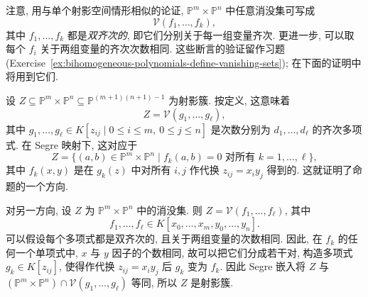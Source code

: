 注意, 用与单个射影空间情形相似的论证, $\mathbb{P}^{m}\times\mathbb{P}^{n}$ 中任意消没集可写成
\[
  \mathcal{V}(f_{1},\ldots,f_{k}),
\]
其中 $f_{1},\ldots,f_{k}$ 都是\emph{双齐次的}, 即它们分别关于每一组变量齐次. 更进一步, 可以取每个 $f_{i}$ 关于两组变量的齐次次数相同. 这些断言的验证留作习题 (Exercise~\ref{ex:bihomogeneous-polynomials-define-vanishing-sets}); 在下面的证明中将用到它们.

\begingroup
\renewcommand{\AJProofBegin}{%
  \par\addvspace{\topsep}\noindent
  {\sffamily\bfseries\CJKfamily{pffont}Proof of Proposition~\ref{prop:projective-subvarieties-of-product-are-vanishing-sets}}\enspace\ignorespaces
}
\begin{Proof}
设 $Z\subseteq\mathbb{P}^{m}\times\mathbb{P}^{n}\subseteq\mathbb{P}^{(m+1)(n+1)-1}$ 为射影簇. 按定义, 这意味着
\[
  Z=\mathcal{V}(g_{1},\ldots,g_{\ell}),
\]
其中 $g_{1},\ldots,g_{\ell}\in K[z_{ij}\mid0\le i\le m,\ 0\le j\le n]$ 是次数分别为 $d_{1},\ldots,d_{\ell}$ 的齐次多项式. 在 Segre 映射下, 这对应于
\[
  Z=\{(a,b)\in\mathbb{P}^{m}\times\mathbb{P}^{n}
      \mid f_{k}(a,b)=0\text{ 对所有 }k=1,\ldots,\ell\},
\]
其中 $f_{k}(x,y)$ 是在 $g_{k}(z)$ 中对所有 $i,j$ 作代换 $z_{ij}=x_{i}y_{j}$ 得到的. 这就证明了命题的一个方向.

对另一方向, 设 $Z$ 为 $\mathbb{P}^{m}\times\mathbb{P}^{n}$ 中的消没集. 则 $Z=\mathcal{V}(f_{1},\ldots,f_{\ell})$, 其中
\[
  f_{1},\ldots,f_{\ell}\in K[x_{0},\ldots,x_{m},y_{0},\ldots,y_{n}].
\]
可以假设每个多项式都是双齐次的, 且关于两组变量的次数相同. 因此, 在 $f_{k}$ 的任何一个单项式中, $x$ 与 $y$ 因子的个数相同, 故可以把它们分成若干对, 构造多项式 $g_{k}\in K[z_{ij}]$, 使得作代换 $z_{ij}=x_{i}y_{j}$ 后 $g_{k}$ 变为 $f_{k}$. 因此 Segre 嵌入将 $Z$ 与 $(\mathbb{P}^{m}\times\mathbb{P}^{n})\cap\mathcal{V}(g_{1},\ldots,g_{\ell})$ 等同, 所以 $Z$ 是射影簇.
\end{Proof}
\endgroup

